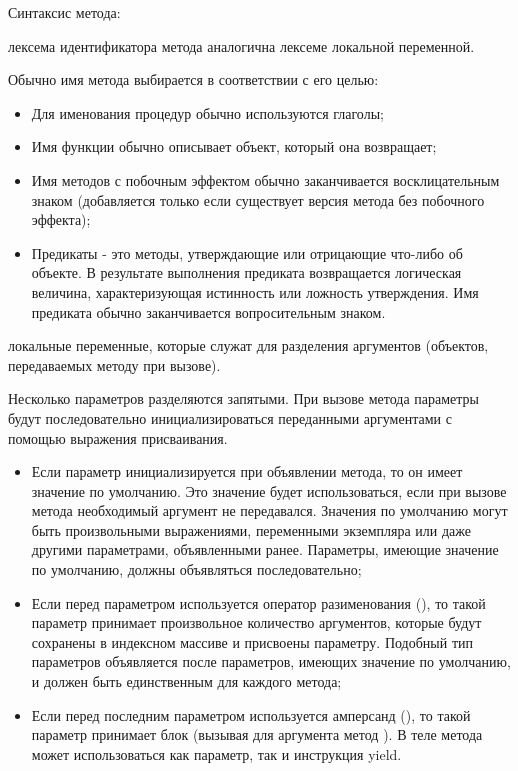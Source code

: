 \begin{keylist}{Синтаксис метода:}
  
   лексема идентификатора метода аналогична лексеме локальной переменной.

  Обычно имя метода выбирается в соответствии с его целью:
  \begin{itemize}
    \item Для именования процедур обычно используются глаголы;
    \item Имя функции обычно описывает объект, который она возвращает;
    \item Имя методов с побочным эффектом обычно заканчивается восклицательным знаком (добавляется только если существует версия метода без побочного эффекта);
    \item Предикаты - это методы, утверждающие или отрицающие что-либо об объекте. В результате выполнения предиката возвращается логическая величина, характеризующая истинность или ложность утверждения. Имя предиката обычно заканчивается вопросительным знаком.
  \end{itemize}
  
   локальные переменные, которые служат для разделения аргументов (объектов, передаваемых методу при вызове).

  Несколько параметров разделяются запятыми. При вызове метода параметры будут последовательно инициализироваться переданными аргументами с помощью выражения присваивания.
  \begin{itemize}
    \item Если параметр инициализируется при объявлении метода, то он имеет значение по умолчанию. Это значение будет использоваться, если при вызове метода необходимый аргумент не передавался. Значения по умолчанию могут быть произвольными выражениями, переменными экземпляра или даже другими параметрами, объявленными ранее. Параметры, имеющие значение по умолчанию, должны объявляться последовательно;

    \item Если перед параметром используется оператор разименования (\mono{*}), то такой параметр принимает произвольное количество аргументов, которые будут сохранены в индексном массиве и присвоены параметру. Подобный тип параметров объявляется после параметров, имеющих значение по умолчанию, и должен быть единственным для каждого метода;

    \item Если перед последним параметром используется амперсанд (\mono{\&}), то такой параметр принимает блок (вызывая для аргумента метод ). В теле метода может использоваться как параметр, так и инструкция yield.
  \end{itemize}


\end{keylist}
